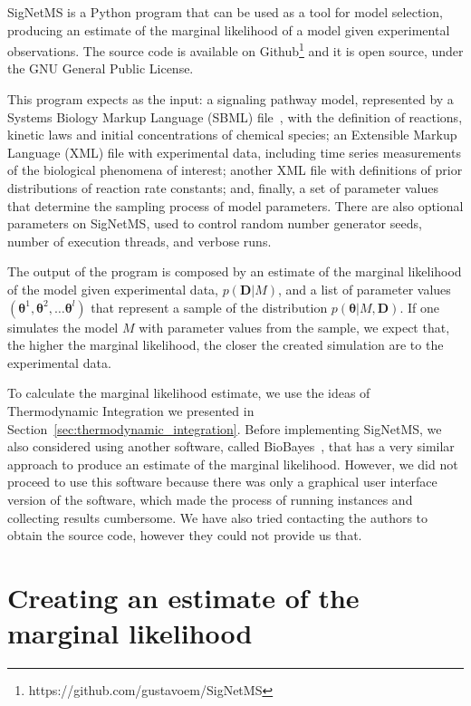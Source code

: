SigNetMS is a Python program that can be used as a tool for model
selection, producing an estimate of the marginal likelihood of a model
given experimental observations. The source code is available on 
Github\footnote{https://github.com/gustavoem/SigNetMS} and it is open
source, under the GNU General Public License.

This program expects as the input: a signaling pathway model,
represented by a Systems Biology Markup Language
(SBML) file~\cite{hucka2003systems}, with the definition of reactions,
kinetic laws and initial concentrations of chemical species; an
Extensible Markup Language (XML) file with experimental data, including 
time series measurements of the  biological phenomena of interest;
another XML file with definitions of prior distributions of reaction
rate constants; and, finally, a set of parameter values that determine
the sampling process of model parameters. There are also optional
parameters on SigNetMS, used to control random number generator seeds,
number of execution threads, and verbose runs.

The output of the program is composed by an estimate of the marginal
likelihood of the model given experimental data, $p({\bm D} | M)$, and a
list of parameter values $({\bm \theta}^1, {\bm \theta}^2, \ldots {\bm
\theta}^l)$ that represent a sample of the distribution $p({\bm \theta}
| M, {\bm D})$. If one simulates the model $M$ with parameter values
from the sample, we expect that, the higher the marginal likelihood, the
closer the created simulation are to the experimental data.

To calculate the marginal likelihood estimate, we use the ideas of 
Thermodynamic Integration we presented in Section~\ref{sec:thermodynamic_integration}. Before implementing
SigNetMS, we also considered using another software, called
BioBayes~\cite{Vyshemirsky2008}, that has a very similar approach to
produce an estimate of the marginal likelihood. However, we did not
proceed to use this software because there was only a graphical user
interface version of the software, which made the process of running
instances and collecting results cumbersome. We have also tried
contacting the authors to obtain the source code, however they could not
provide us that.

\section{Creating an estimate of the marginal likelihood}
\label{sec:creating_an_estimate_of_the_marginal_likelihood}

